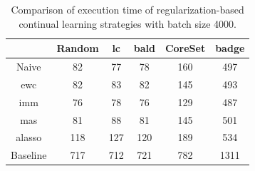 \begin{table}[h]
    \centering
    \begin{tabular}{c | c c c c c } 
         & Random & \gls{lc} & \gls{bald} & CoreSet & \gls{badge}\\ 
        \hline
        Naive & 82 & 77 & 78 & 160 & 497 \\
        \gls{ewc} & 82 & 83 & 82 & 145 & 493\\
        \gls{imm} & 76 & 78 & 76 & 129 & 487\\
        \gls{mas} & 81 & 88 & 81 & 145 & 501\\
        \gls{alasso} & 118 & 127 & 120 & 189 & 534\\
        \hline 
        Baseline & 717 & 712 & 721 & 782 & 1311 \\
    \end{tabular}
    \caption{Comparison of execution time of regularization-based continual learning strategies
    with batch size 4000.}
    \label{fig:Evaluation:CAL:4000bTime}
\end{table}



